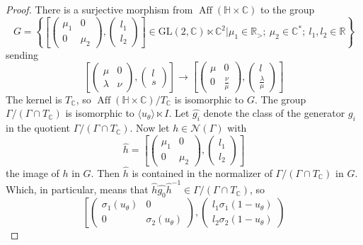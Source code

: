\documentclass[12pt]{amsart}
\newcommand{\R}{\mathbb{R}}
\newcommand{\C}{\mathbb{C}}
\newcommand{\HH}{\mathbb{H}}
\newcommand{\Nc}{\mathcal{N}}
\DeclareMathOperator{\Aff}{Aff}
\begin{document}
\begin{proof}
There is a surjective morphism from $\Aff(\HH \times \C)$ to the group
$$G=
\left\{
\left[
\begin{pmatrix}
\mu_1 & 0\\
0 & \mu_2
\end{pmatrix},
\begin{pmatrix}
l_1 \\
l_2
\end{pmatrix}
\right] \in \text{GL}(2, \C) \ltimes \C^2\vert \mu_1\in \R_>;\  \mu_2\in \C^*;\  l_1, l_2 \in \R \right\}$$
sending
$$\left[
\begin{pmatrix}
\mu & 0\\
\lambda & \nu
\end{pmatrix},
\begin{pmatrix}
l \\
s
\end{pmatrix}
\right] \to
\left[
\begin{pmatrix}
\mu & 0\\
0 & \frac{\nu}{\mu}
\end{pmatrix},
\begin{pmatrix}
l \\
\frac{\lambda}{\mu}
\end{pmatrix}
\right]
$$
The kernel is $T_\C$, so $\Aff(\HH \times \C)/T_\C$ is isomorphic to $G$. The group $\Gamma/(\Gamma \cap T_\C)$ is isomorphic to $\langle u_\theta \rangle \ltimes I$. Let $\hat{g_i}$ denote the class of the generator $g_i$ in the quotient $\Gamma / (\Gamma \cap T_\C)$. Now let $h \in \Nc(\Gamma)$ with 
$$\hat{h} =
\left[
\begin{pmatrix}
\mu_1 & 0\\
0 & \mu_2
\end{pmatrix},
\begin{pmatrix}
l_1 \\
l_2
\end{pmatrix}
\right]
$$
the image of $h$ in $G$. Then $\hat{h}$ is contained in the normalizer of $\Gamma/(\Gamma \cap T_\C)$ in $G$. Which, in particular, means that $\hat{h}\hat{g_0}\hat{h}^{-1} \in \Gamma/(\Gamma\cap T_\C)$, so 
$$\left[
\begin{pmatrix}
\sigma_1(u_\theta) & 0\\
0 & \sigma_2(u_\theta)
\end{pmatrix},
\begin{pmatrix}
l_1\sigma_1(1-u_\theta) \\
l_2\sigma_2(1-u_\theta)
\end{pmatrix}
$$
\end{proof}
\end{document}
